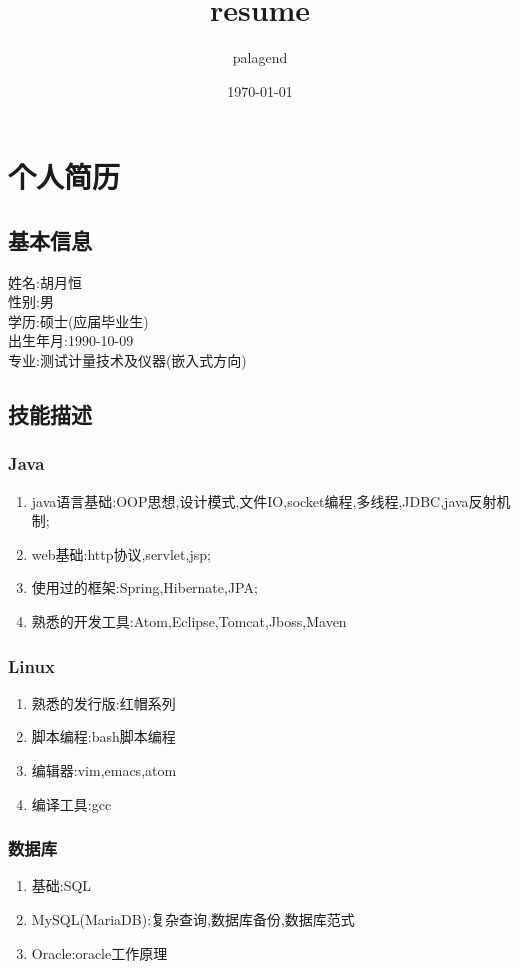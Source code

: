 \documentclass{ctexart}
\author{palagend}
\date{\today}
\title{resume}
\begin{document}
\maketitle
\tableofcontents

\section{个人简历}
\label{sec-1}
\subsection{基本信息}
\label{sec-1-1}
\noindent 姓名:胡月恒\\
性别:男\\
学历:硕士(应届毕业生)\\
出生年月:1990-10-09\\
专业:测试计量技术及仪器(嵌入式方向)\\
\subsection{技能描述}
\label{sec-1-2}
\subsubsection{Java}
\label{sec-1-2-1}
\begin{enumerate}
\item java语言基础:OOP思想,设计模式,文件IO,socket编程,多线程,JDBC,java反射机制;
\item web基础:http协议,servlet,jsp;
\item 使用过的框架:Spring,Hibernate,JPA;
\item 熟悉的开发工具:Atom,Eclipse,Tomcat,Jboss,Maven
\end{enumerate}
\subsubsection{Linux}
\label{sec-1-2-2}
\begin{enumerate}
\item 熟悉的发行版:红帽系列
\item 脚本编程:bash脚本编程
\item 编辑器:vim,emacs,atom
\item 编译工具:gcc
\end{enumerate}
\subsubsection{数据库}
\label{sec-1-2-3}
\begin{enumerate}
\item 基础:SQL
\item MySQL(MariaDB):复杂查询,数据库备份,数据库范式
\item Oracle:oracle工作原理
\end{enumerate}
\end{document}

